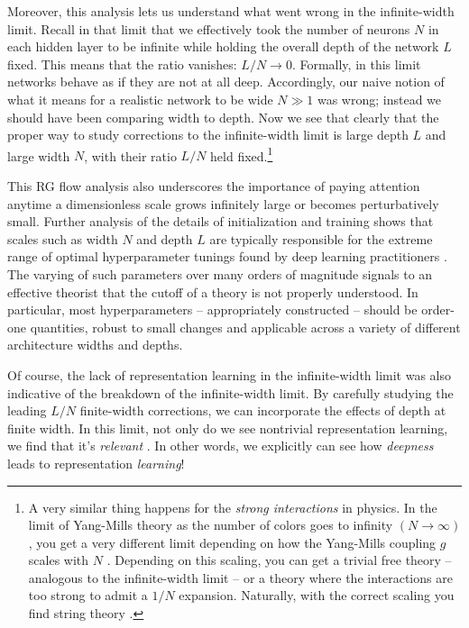 \documentclass[12pt]{article}
\begin{document}
Moreover, this analysis lets us understand what went wrong in the infinite-width limit. Recall in that limit that we effectively took the number of neurons $N$ in each hidden layer to be infinite while holding the overall depth of the network $L$ fixed. This means that the ratio vanishes: $L/N \to 0$. Formally, in this limit networks behave as if they are not at all deep. Accordingly, our naive notion of what it means for a realistic network to be wide $N \gg 1$ was wrong; instead we should have been comparing width to depth.
Now we see that clearly that the proper way to study corrections to the infinite-width limit is large depth $L$ and large width $N$, with their ratio $L/N$ held fixed.\footnote{
    A very similar thing happens for the \emph{strong interactions} in physics. In the limit of Yang-Mills theory as the number of colors goes to infinity $(N\to\infty)$, you get a very different limit depending on how the Yang-Mills coupling $g$ scales with $N$ \cite{tHooft:1973jz}. Depending on this scaling, you can get a trivial free theory -- analogous to the infinite-width limit -- or a theory where the interactions are too strong to admit a $1/N$ expansion. Naturally, with the correct scaling you find string theory \cite{Maldacena:1997re}. 
}

This RG flow analysis also underscores the importance of paying attention anytime a dimensionless scale grows infinitely large or becomes perturbatively small. Further analysis of the details of initialization and training shows that scales such as width $N$ and depth $L$ are typically responsible for the extreme range of optimal hyperparameter tunings found by deep learning practitioners \cite{Principles}. The varying of such parameters over many orders of magnitude signals to an effective theorist that the cutoff of a theory is not properly understood. In particular, most hyperparameters -- appropriately constructed -- should be order-one quantities, robust to small changes and applicable across a variety of different architecture widths and depths.



Of course, the lack of representation learning in the infinite-width limit was also indicative of the breakdown of the infinite-width limit. By carefully studying the leading $L/N$ finite-width corrections, we can incorporate the effects of depth at finite width. In this limit, not only do we see nontrivial representation learning, we find that it's \emph{relevant} \cite{Principles}. In other words, we explicitly can see how \emph{deepness} leads to representation \emph{learning}!
\end{document}
